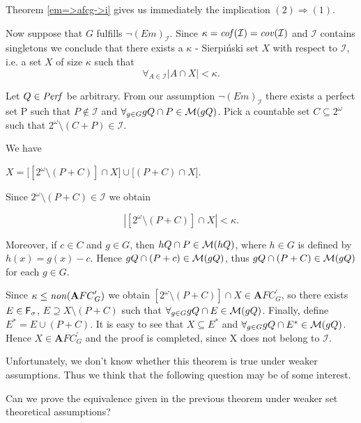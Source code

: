 \documentclass[b5cutpaper, twoside, 11pt, leqno]{moravica}
\newcommand{\afcp}{{\mathbf AFC}^\prime}
\newcommand\afcg{\afcp_{G}}
\newcommand{\seq}{\subseteq}
\newcommand{\ca}{2^{\omega}}
\newcommand{\mgr}{{\cal M}}
\newcommand{\perf}{{\it Perf}}
\newcommand{\fsigma}{{\sf F}_{\sigma}}
\newcommand{\cof}{{\it cof}}
\newcommand{\cov}{{\it cov}}
\newcommand{\non}{{\it non}}
\newcommand{\calI}{{\mathcal{I}}}
\theoremstyle{definition}
\begin{document}
\proof

Theorem \ref{em=>afcg->i}
gives us immediately the implication $(2) \Rightarrow (1)$.


  Now suppose that $G$ fulfills $\neg (Em)_{\calI}$.
Since $\kappa = \cof(\calI) = \cov(\calI)$
and $\calI$ contains singletons we conclude that
there exists a $\kappa$ - Sierpi\'nski set $X$ with
respect to $\calI$, i.e. a set $X$ of size
$\kappa$ such that
  \[
    \forall_{A \in \calI} |A \cap X| < \kappa.
  \]



Let $Q \in \perf$ be arbitrary.
From our assumption $\neg (Em)_{\calI}$
there exists a perfect set P
such that $P \not\in \calI$ and
$\forall_{g \in G} gQ \cap P \in \mgr(gQ)$.
  Pick a countable set $C \seq \ca$ such that
$\ca \setminus (C+P) \in \calI$.

We have

$X =
  \big[ [\ca \setminus (P+C) ] \cap X \big]
\cup
  \big[ (P+C) \cap X \big]$.

Since $\ca \setminus (P + C) \in \calI$ we obtain

\[ | [ \ca \setminus (P + C) ] \cap X | < \kappa. \]

Moreover, if $c \in C$ and $g \in G$, then
$hQ \cap P \in \mgr(hQ)$,
where $h \in G$ is defined by $h(x) = g(x) - c$.
  Hence $gQ \cap (P + c) \in \mgr(gQ)$,
thus
  $gQ \cap (P + C) \in \mgr(gQ)$ for each $g \in G$.

  Since $\kappa \leq \non(\afcg)$ we obtain
$[ \ca \setminus (P+C)] \cap X \in \afcg$,
so there exists $E \in \fsigma$,
$E \supseteq X \setminus (P + C)$ such that
$\forall_{g \in G} gQ \cap E \in \mgr(gQ)$.
  Finally, define $E^* = E \cup (P + C)$.
It is easy to see that $X \seq E^*$ and
$\forall_{g \in G} gQ \cap E^* \in \mgr(gQ)$.
  Hence $X \in \afcg$ and the proof is
completed, since X does not belong to $\calI$.
\medskip

  Unfortunately, we don't know whether this
theorem is true under weaker assumptions.
  Thus we think that the following question may be of
some interest.

\begin{question}
Can we prove the equivalence given in the previous theorem
under weaker set theoretical assumptions?
\end{question}

\end{document}

